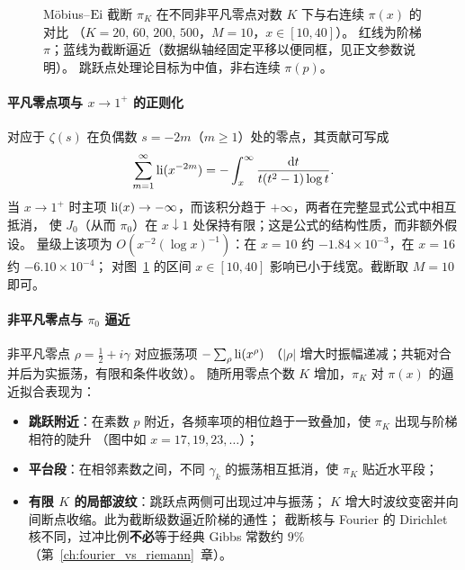 \begin{figure}[htbp]
\caption{Möbius--$\operatorname{Ei}$ 截断 $\pi_K$ 在不同非平凡零点对数 $K$ 下与右连续 $\pi(x)$ 的对比
（$K=20,\,60,\,200,\,500$，$M=10$，$x\in[10,40]$）。
红线为阶梯 $\pi$；蓝线为截断逼近（数据纵轴经固定平移以便同框，见正文参数说明）。
跳跃点处理论目标为中值，非右连续 $\pi(p)$。}
\label{fig:pi_comparison_merged}
\end{figure}

\vspace{0.3cm}

\paragraph{平凡零点项与 $x\to 1^+$ 的正则化}
对应于 $\zeta(s)$ 在负偶数 $s=-2m$（$m\ge 1$）处的零点，其贡献可写成
\[
\sum_{m=1}^{\infty}\operatorname{li}(x^{-2m})
=
-\int_x^{\infty}\frac{\mathrm{d}t}{t(t^2-1)\log t}.
\]
当 $x\to 1^+$ 时主项 $\operatorname{li}(x)\to-\infty$，而该积分趋于 $+\infty$，两者在完整显式公式中相互抵消，
使 $J_0$（从而 $\pi_0$）在 $x\downarrow 1$ 处保持有限；这是公式的结构性质，而非额外假设。
量级上该项为 $O(x^{-2}(\log x)^{-1})$：在 $x=10$ 约 $-1.84\times 10^{-3}$，在 $x=16$ 约 $-6.10\times 10^{-4}$；
对图~\ref{fig:pi_comparison_merged} 的区间 $x\in[10,40]$ 影响已小于线宽。截断取 $M=10$ 即可。

\paragraph{非平凡零点与 $\pi_0$ 逼近}
非平凡零点 $\rho=\frac12+i\gamma$ 对应振荡项 $-\sum_{\rho}\operatorname{li}(x^{\rho})$
（$|\rho|$ 增大时振幅递减；共轭对合并后为实振荡，有限和条件收敛）。
随所用零点个数 $K$ 增加，$\pi_K$ 对 $\pi(x)$ 的逼近拟合表现为：
\begin{itemize}
  \item \textbf{跳跃附近}：在素数 $p$ 附近，各频率项的相位趋于一致叠加，使 $\pi_K$ 出现与阶梯相符的陡升
        （图中如 $x=17,19,23,\ldots$）；
  \item \textbf{平台段}：在相邻素数之间，不同 $\gamma_k$ 的振荡相互抵消，使 $\pi_K$ 贴近水平段；
  \item \textbf{有限 $K$ 的局部波纹}：跳跃点两侧可出现过冲与振荡；
        $K$ 增大时波纹变密并向间断点收缩。此为截断级数逼近阶梯的通性；
        截断核与 Fourier 的 Dirichlet 核不同，过冲比例\textbf{不必}等于经典 Gibbs 常数约 $9\%$
        （第~\ref{ch:fourier_vs_riemann}~章）。
\end{itemize}

